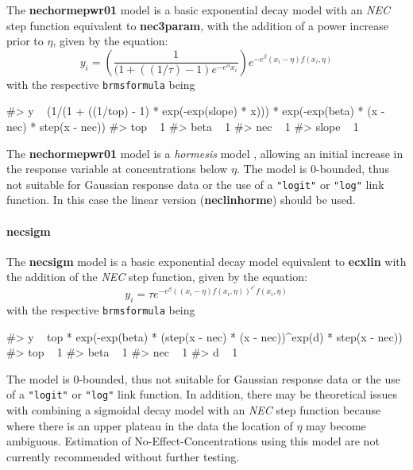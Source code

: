 The \textbf{nechormepwr01} model is a basic exponential decay model with
an \emph{NEC} step function equivalent to \textbf{nec3param}, with the
addition of a power increase prior to \(\eta\), given by the equation:
\[y_i = \left(\frac{1}{(1 + ((1/\tau)-1)  e^{-e^{\alpha}x_i}}\right) e^{-e^{\beta} \left(x_i - \eta \right) f(x_i, \eta)}\]
with the respective \texttt{brmsformula} being

\begin{Schunk}
\begin{Soutput}
#> y ~ (1/(1 + ((1/top) - 1) * exp(-exp(slope) * x))) * exp(-exp(beta) * (x - nec) * step(x - nec)) 
#> top ~ 1
#> beta ~ 1
#> nec ~ 1
#> slope ~ 1
\end{Soutput}
\end{Schunk}

The \textbf{nechormepwr01} model is a \emph{hormesis} model
\citep{Mattson2008}, allowing an initial increase in the response
variable at concentrations below \(\eta\). The model is 0-bounded, thus
not suitable for Gaussian response data or the use of a \texttt{"logit"}
or \texttt{"log"} link function. In this case the linear version
(\textbf{neclinhorme}) should be used.

\hypertarget{necsigm}{%
\paragraph{necsigm}\label{necsigm}}

The \textbf{necsigm} model is a basic exponential decay model equivalent
to \textbf{ecxlin} with the addition of the \emph{NEC} step function,
given by the equation:
\[y_i = \tau e^{-e^{\beta} ((x_i - \eta) f(x_i, \eta))^{e^\epsilon}f(x_i, \eta)}\]
with the respective \texttt{brmsformula} being

\begin{Schunk}
\begin{Soutput}
#> y ~ top * exp(-exp(beta) * (step(x - nec) * (x - nec))^exp(d) * step(x - nec)) 
#> top ~ 1
#> beta ~ 1
#> nec ~ 1
#> d ~ 1
\end{Soutput}
\end{Schunk}

The model is 0-bounded, thus not suitable for Gaussian response data or
the use of a \texttt{"logit"} or \texttt{"log"} link function. In
addition, there may be theoretical issues with combining a sigmoidal
decay model with an \emph{NEC} step function because where there is an
upper plateau in the data the location of \(\eta\) may become ambiguous.
Estimation of No-Effect-Concentrations using this model are not
currently recommended without further testing.

